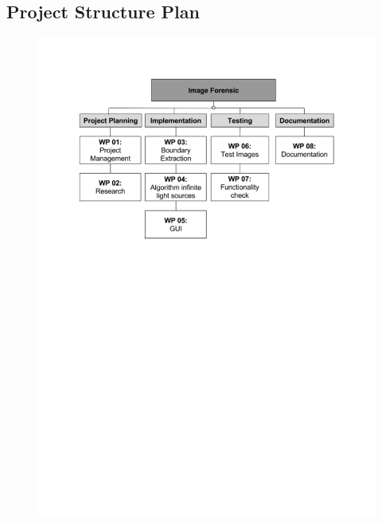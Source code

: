 \subsection{Project Structure Plan} \label{sec:StructurePlan}
\begin{figure}[H] 
	\center 
	\includegraphics[scale = 0.8]{Images/Project Structure Plan.pdf}		
\end{figure}

